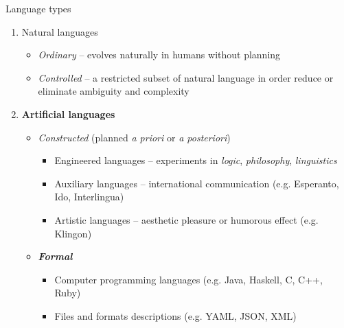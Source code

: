 \documentclass{beamer}
\begin{document}
\begin{frame}{Language types}
\begin{enumerate}
\item Natural languages
\begin{itemize}
\item \textit{Ordinary} -- evolves naturally in humans without planning
\item \textit{Controlled} -- a restricted subset of natural language in order reduce or eliminate ambiguity and complexity
\end{itemize}
\item \textbf{Artificial languages}
\begin{itemize}
\item \textit{Constructed} (planned \textit{a priori} or \textit{a posteriori})
\begin{itemize}
\item Engineered languages -- experiments in \textit{logic}, \textit{philosophy}, \textit{linguistics}
\item Auxiliary languages -- international communication (e.g. Esperanto, Ido,  Interlingua)
\item Artistic languages -- aesthetic pleasure or humorous effect (e.g. Klingon)
\end{itemize}
\item \textit{\textbf{Formal}}
\begin{itemize}
\item Computer programming languages (e.g. Java, Haskell, C, C++, Ruby)
\item Files and formats descriptions (e.g. YAML, JSON, XML)
\end{itemize}
\end{itemize}
\end{enumerate}
\end{frame}
\end{document}
